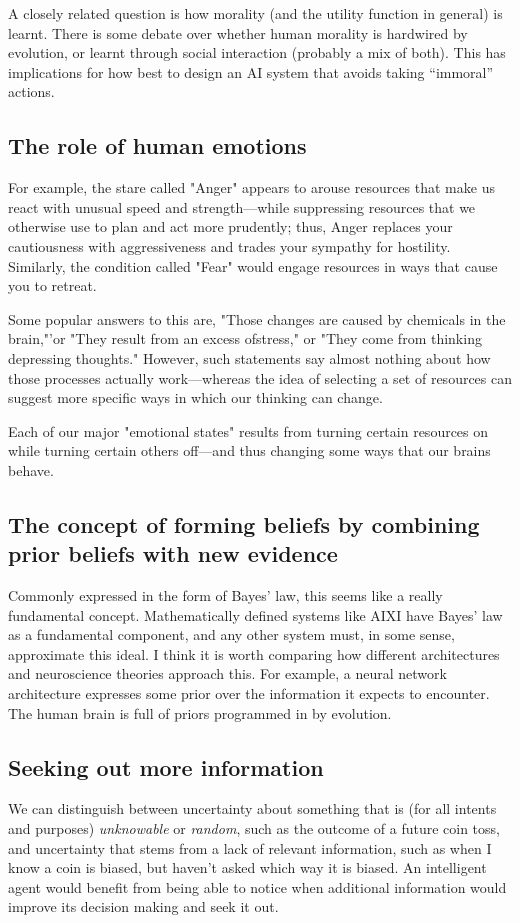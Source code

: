 \documentclass[10pt,a4paper]{article}
\newcommand{\nquote}[1]{``{#1}''}
\begin{document}
A closely related question is how morality (and the utility function in general) is learnt. There is some debate over whether human morality is hardwired by evolution, or learnt through social interaction (probably a mix of both). This has implications for how best to design an AI system that avoids taking \nquote{immoral} actions.

\subsection{The role of human emotions}
For example, the stare called "Anger" appears to arouse
resources that make us react with unusual speed and strength—while suppressing resources that we otherwise use to plan and act more prudently; thus, Anger replaces your cautiousness with aggressiveness and trades your sympathy for hostility. Similarly, the condition called "Fear" would engage resources in ways that cause you to retreat. \cite[p.~3]{minsky}

Some popular answers to this are, "Those changes are caused by chemicals in the brain,"'or "They result from an excess ofstress," or "They come from thinking depressing thoughts." However, such statements say almost nothing about how those processes actually work—whereas the idea of selecting a set of resources can suggest more specific ways in which our thinking can change. \cite[p.~3]{minsky}

Each of our major "emotional states" results from turning certain
resources on while turning certain others off—and thus changing
some ways that our brains behave. \cite[p.~4]{minsky}


\subsection{The concept of forming beliefs by combining prior beliefs with new evidence}
Commonly expressed in the form of Bayes' law, this seems like a really fundamental concept. Mathematically defined systems like AIXI have Bayes' law as a fundamental component, and any other system must, in some sense, approximate this ideal. I think it is worth comparing how different architectures and neuroscience theories approach this. For example, a neural network architecture expresses some prior over the information it expects to encounter. The human brain is full of priors programmed in by evolution.

\subsection{Seeking out more information}
We can distinguish between uncertainty about something that is (for all intents and purposes) \emph{unknowable} or \emph{random}, such as the outcome of a future coin toss, and uncertainty that stems from a lack of relevant information, such as when I know a coin is biased, but haven't asked which way it is biased. An intelligent agent would benefit from being able to notice when additional information would improve its decision making and seek it out.
\end{document}
